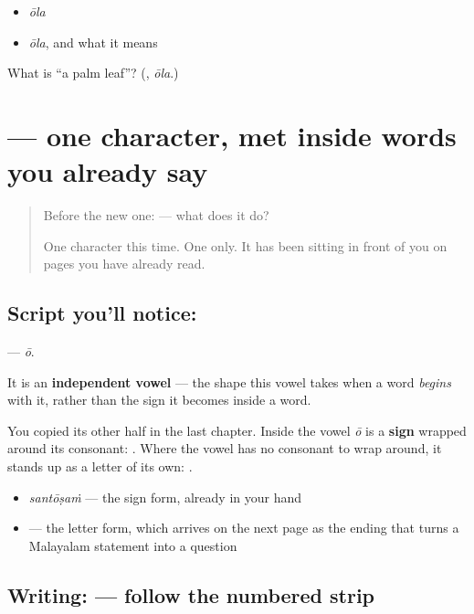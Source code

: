 \begin{itemize}
\raggedright
  \item \emph{ōla}
  \item \emph{ōla}, and what it means
\end{itemize}

\begin{tcolorbox}[breakable,colback=teal!4,colframe=teal!35!black,title={Before you move on}]
What is \textquotedblleft{}a palm leaf\textquotedblright{}? (\textbf{}, \emph{ōla}.)
\end{tcolorbox}
\section[\texorpdfstring{\ml{ഓ} (ō)}{ഓ (ō)}]{ — one character, met inside words you already say}

\label{lesson:ML-S126-letter-oo}



\begin{quote}
Before the new one:  — what does it do?

One character this time. One only. It has been sitting in front of you on pages you have already read.
\end{quote}

\subsection*{Script you'll notice: }
\textbf{} — \emph{ō}.

It is an \textbf{independent vowel} — the shape this vowel takes when a word \emph{begins} with it, rather than the sign it becomes inside a word.

You copied its other half in the last chapter. Inside \textbf{} the vowel \emph{ō} is a \textbf{sign} wrapped around its consonant: \textbf{}. Where the vowel has no consonant to wrap around, it stands up as a letter of its own: \textbf{}.

\begin{itemize}
\raggedright
  \item \textbf{} \emph{santōṣaṁ} — the sign form, already in your hand
  \item \textbf{} — the letter form, which arrives on the next page as the ending that turns a Malayalam statement into a question
\end{itemize}

\subsection*{Writing:  — follow the numbered strip}


